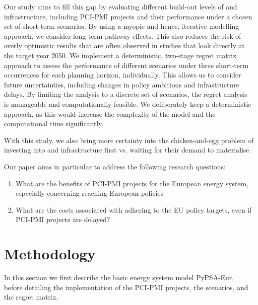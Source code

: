\documentclass[preprint,12pt,sort&compress]{elsarticle}
\begin{document}
Our study aims to fill this gap by evaluating different build-out levels of  and  infrastructure, including PCI-PMI projects and their performance under a chosen set of short-term scenarios. By using a myopic and hence, iterative modelling approach, we consider long-term pathway effects. This also reduces the risk of overly optimistic results that are often observed in studies that look directly at the target year 2050.
We implement a deterministic, two-stage regret matrix approach to assess the performance of different scenarios under three short-term occurrences for each planning horizon, individually. This allows us to consider future uncertainties, including changes in policy ambitions and infrastructure delays. By limiting the analysis to a discrete set of scenarios, the regret analysis is manageable and computationally feasible. We deliberately keep a deterministic approach, as this would increase the complexity of the model and the computational time significantly.

With this study, we also bring more certainty into the chicken-and-egg problem of investing into  and  infrastructure first vs. waiting for their demand to materialise.

Our paper aims in particular to address the following research questions:

\begin{enumerate} 
  \item What are the benefits of PCI-PMI projects for the European energy system, especially concerning reaching European policies
  \item What are the costs associated with adhering to the EU policy targets, even if PCI-PMI projects are delayed? 
\end{enumerate}

\section{Methodology}
\label{sec:methodology}
In this section we first describe the basic energy system model PyPSA-Eur, before detailing the implementation of the PCI-PMI projects, the scenarios, and the regret matrix.
\end{document}
